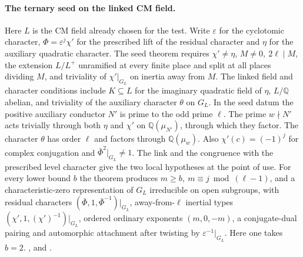 \paragraph{The ternary seed on the linked CM field.}
Here \(L\) is the CM field already chosen for the test. Write
\(\varepsilon\) for the cyclotomic character,
\(\Phi=\varepsilon^j\chi'\) for the prescribed lift of the residual
character and \(\eta\) for the auxiliary quadratic character. The
seed theorem requires \(\chi'\ne\eta\), \(M\ne0,\ 2\ell\mid M\),
the extension \(L/L^+\) unramified at every finite place and split
at all places dividing \(M\),
and triviality of \(\chi'|_{G_L}\) on inertia away from \(M\).
The linked field and character conditions include \(K\subseteq L\)
for the imaginary quadratic field of \(\eta\), \(L/\mathbb Q\) abelian,
and triviality of the auxiliary character \(\theta\) on \(G_L\).
In the seed datum the positive auxiliary conductor \(N'\) is prime to
the odd prime \(\ell\). The prime \(w\nmid N'\) acts trivially through
both \(\eta\) and \(\chi'\) on \(\mathbb Q(\mu_{N'})\), through which
they factor. The character \(\theta\) has order \(\ell\) and factors
through \(\mathbb Q(\mu_w)\). Also \(\chi'(c)=(-1)^j\) for complex
conjugation and \(\bar\Phi^2|_{G_L}\ne1\). The link and the congruence with
the prescribed level character give the two local hypotheses at
the point of use. For every lower bound \(b\) the theorem produces
\(m\ge b,\ m\equiv j\bmod(\ell-1)\), and a characteristic-zero
representation of \(G_L\) irreducible on open subgroups, with residual
characters \((\bar\Phi,1,\bar\Phi^{-1})|_{G_L}\), away-from-\(\ell\)
inertial types \((\chi',1,(\chi')^{-1})|_{G_L}\), ordered ordinary
exponents \((m,0,-m)\), a conjugate-dual pairing and automorphic
attachment after twisting by \(\varepsilon^{-1}|_{G_L}\).
Here one takes \(b=2\).
,
and .

